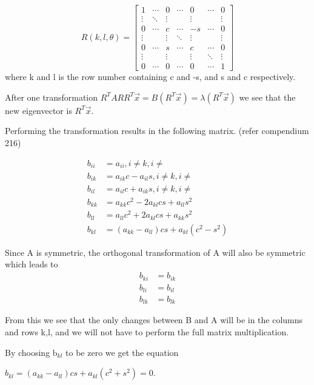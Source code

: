 $$R(k,l,\theta) =
\begin{bmatrix}
  1       & \cdots  & 0       & \cdots  & 0       & \cdots  & 0 \\
  \vdots  & \ddots  &  \vdots &         & \vdots  &         & \vdots \\
  0       & \cdots  & c       & \cdots  & -s      & \cdots  & 0 \\
  \vdots  &         & \vdots  & \ddots  & \vdots  &         & \vdots\\
  0       & \cdots  & s       & \cdots  & c       & \cdots  & 0\\
  \vdots  &         & \vdots  &         &  \vdots & \ddots  & \vdots\\
  0       & \cdots  & 0       & \cdots  & 0       & \cdots  & 1
\end{bmatrix}
$$
where k and l is the row number containing c and -s, and s and c respectively.


After one transformation $R^T A R R^T \vec{x} = B (R^T \vec{x}) = \lambda (R^T
\vec{x})$ we see that the new eigenvector is $R^T\vec{x}$.

Performing the transformation results in the following matrix.
(refer compendium 216)

\begin{align}
  b_{ii} &= a_{ii}, i \neq k, i \neq \\
  b_{ik} &= a_{ik}c - a_{il}s, i \neq k, i \neq \\
  b_{il} &= a_{il}c + a_{ik}s, i \neq k, i \neq \\
  b_{kk} &= a_{kk}c^2 - 2a_{kl}cs + a_{ll}s^2 \\
  b_{ll} &= a_{ll}c^2 + 2a_{kl}cs + a_{kk}s^2 \\
  b_{kl} &= (a_{kk}- a_{ll})cs + a_{kl}(c^2 - s^2)
\end{align}

Since A is symmetric, the orthogonal transformation of A will also be symmetric
which leads to
\begin{align}
  b_{ki} &= b_{ik} \\
  b_{li} &= b_{il} \\
  b_{lk} &= b_{lk}
\end{align}

From this we see that the only changes between B and A will be in the columns
and rows k,l, and we will not have to perform the full matrix multiplication.

By choosing b$_{kl}$ to be zero we get the equation

$b_{kl} = (a_{kk}-a_{ll})cs + a_{kl} (c^2 + s^2) = 0$.


